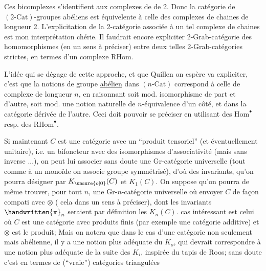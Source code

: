 
Ces bicomplexes s'identifient aux complexes de  de  2. Donc la catégorie de $(2\text{-}\mathrm{Cat})$-groupes abéliens est équivelente à celle des complexes de chaines de longueur 2. L'explicitation de la 2-catégorie associée à un tel complexe de chaines est mon interprétation chérie. Il faudrait encore expliciter  2-Grab-catégorie des homomorphismes (en un sens à préciser) entre deux telles 2-Grab-catégories strictes, en termes d'un complexe $\mathrm{RHom}$.

L'idée qui se dégage de cette approche, et que Quillen on espère va expliciter, c'est que la  notions de groupe \uline{abélien} dans $(n\text{-}\mathrm{Cat})$ correspond à celle de complexe de  longueur $n$, en raisonnant soit mod. isomorphisme de part et d'autre, soit mod. une notion naturelle de $n$-équivalence d'un côté, et dans la catégorie dérivée de l'autre. Ceci doit pouvoir se préciser en utilisant des $\mathrm{Hom}^{\bullet}$ resp. des $\mathrm{RHom}^{\bullet}$.

Si maintenant $C$ est une catégorie avec un ``produit tensoriel''  (et éventuellement unitaire), i.e. un bifoncteur avec des isomorphismes d'associativité (mais sans inverse ...), on peut lui associer \deleted{\unsure{(}}sans doute une Gr-catégorie universelle (tout comme à un monoïde on associe  groupe symmétrisé), d'où des invariants, qu'on pourra désigner par $K_{\unsure{o|0}}(C)$ et $K_1(C)$. On suppose qu'on pourra de même trouver, pour tout $n$, une Gr-$n$-catégorie universelle où envoyer $C$ de façon compati avec $\otimes$ ( cela dans un sens à préciser), dont les invariants $\handwritten{\pi}_n$ seraient par définition les $K_n(C)$.  cas intéressant est celui où $C$ est une catégorie avec produits finis (par exemple une catégorie additive) et $\otimes$ est le produit;  \deleted{(}\handwritten{[}Mais on notera que dans le cas d'une catégorie non seulement  mais abélienne, il y a une notion plus adéquate du $K_o$, qui devrait correspondre à une notion plus adéquate de la suite des $K_i$, inspirée du tapis de Roos; sans doute c'est en termes de (``vraie'') catégories triangulées

